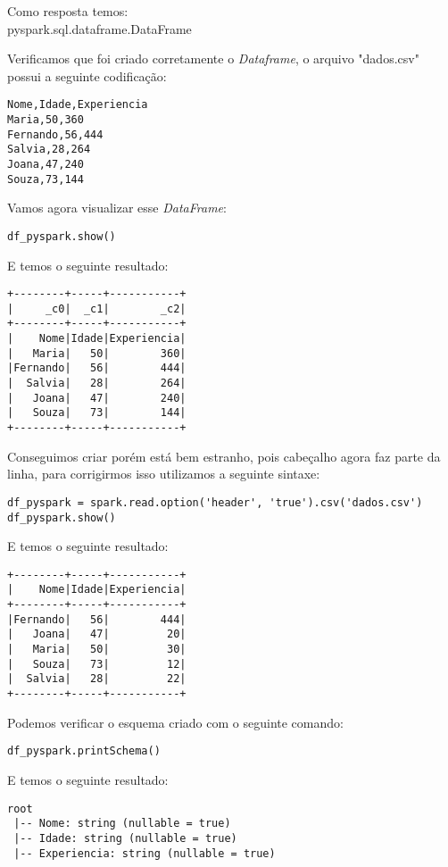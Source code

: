 Como resposta temos: \\
{\ttfamily pyspark.sql.dataframe.DataFrame}

Verificamos que foi criado corretamente o \textit{Dataframe}, o arquivo "dados.csv" possui a seguinte codificação:
\begin{lstlisting}[]
Nome,Idade,Experiencia
Maria,50,360
Fernando,56,444
Salvia,28,264
Joana,47,240
Souza,73,144
\end{lstlisting}

Vamos agora visualizar esse \textit{DataFrame}:
\begin{lstlisting}[]
df_pyspark.show()
\end{lstlisting}

E temos o seguinte resultado: \vspace{-1.5em}
\begin{verbatim}
+--------+-----+-----------+
|     _c0|  _c1|        _c2|
+--------+-----+-----------+
|    Nome|Idade|Experiencia|
|   Maria|   50|        360|
|Fernando|   56|        444|
|  Salvia|   28|        264|
|   Joana|   47|        240|
|   Souza|   73|        144|
+--------+-----+-----------+
\end{verbatim}

Conseguimos criar porém está bem estranho, pois cabeçalho agora faz parte da linha, para corrigirmos isso utilizamos a seguinte sintaxe:
\begin{lstlisting}[]
df_pyspark = spark.read.option('header', 'true').csv('dados.csv')
df_pyspark.show()
\end{lstlisting}

E temos o seguinte resultado: \vspace{-1.5em}
\begin{verbatim}
+--------+-----+-----------+
|    Nome|Idade|Experiencia|
+--------+-----+-----------+
|Fernando|   56|        444|
|   Joana|   47|         20|
|   Maria|   50|         30|
|   Souza|   73|         12|
|  Salvia|   28|         22|
+--------+-----+-----------+
\end{verbatim}

Podemos verificar o esquema criado com o seguinte comando:
\begin{lstlisting}[]
df_pyspark.printSchema()
\end{lstlisting}

E temos o seguinte resultado: \vspace{-1.5em}
\begin{verbatim}
root
 |-- Nome: string (nullable = true)
 |-- Idade: string (nullable = true)
 |-- Experiencia: string (nullable = true)
\end{verbatim}

